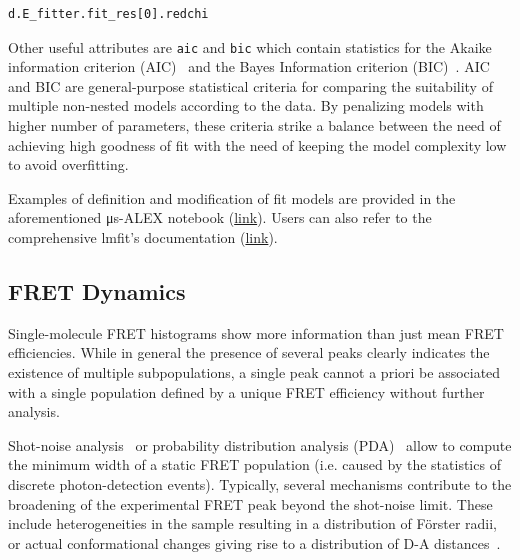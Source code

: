 \documentclass[10pt,letterpaper]{article}
\begin{document}
\begin{lstlisting}
d.E_fitter.fit_res[0].redchi
\end{lstlisting}

Other useful attributes are \verb|aic| and \verb|bic| which contain
statistics for the Akaike information criterion (AIC)~\cite{akaike_new_1974} 
and the Bayes Information criterion (BIC)~\cite{schwarz_estimating_1978}.
AIC and BIC are general-purpose statistical criteria for comparing the
suitability of multiple non-nested models according to the data.
By penalizing models with higher number of parameters, these criteria 
strike a balance between the need of achieving high goodness of fit 
with the need of keeping the model complexity low to avoid overfitting.

Examples of definition and modification of fit models are provided in
the aforementioned μs-ALEX notebook
(\href{http://nbviewer.jupyter.org/github/tritemio/FRETBursts_notebooks/blob/master/notebooks/FRETBursts%20-%20us-ALEX%20smFRET%20burst%20analysis.ipynb#FRET-fit:-in-depth-example}{link}).
Users can also refer to the comprehensive lmfit's documentation
(\href{http://lmfit.github.io/lmfit-py/}{link}).

\subsection*{FRET Dynamics}
\label{sec:dynamics}

Single-molecule FRET histograms show more information than just mean FRET efficiencies.
While in general the presence of several peaks clearly indicates the existence of
multiple subpopulations, a single peak cannot a priori be associated with
a single population defined by a unique FRET efficiency without further analysis.

Shot-noise analysis~\cite{Nir_2006} or probability
distribution analysis (PDA)~\cite{Antonik2006,kalinin_probability_2007}
allow to compute the minimum width of a static FRET population
(i.e. caused by the statistics of discrete photon-detection events).
Typically, several mechanisms
contribute to the broadening of the experimental FRET peak
beyond the shot-noise limit. These include heterogeneities in the sample
resulting in a distribution of Förster radii,
or actual conformational changes giving rise to a distribution
of D-A distances~\cite{Sisamakis_2010}.
\end{document}
